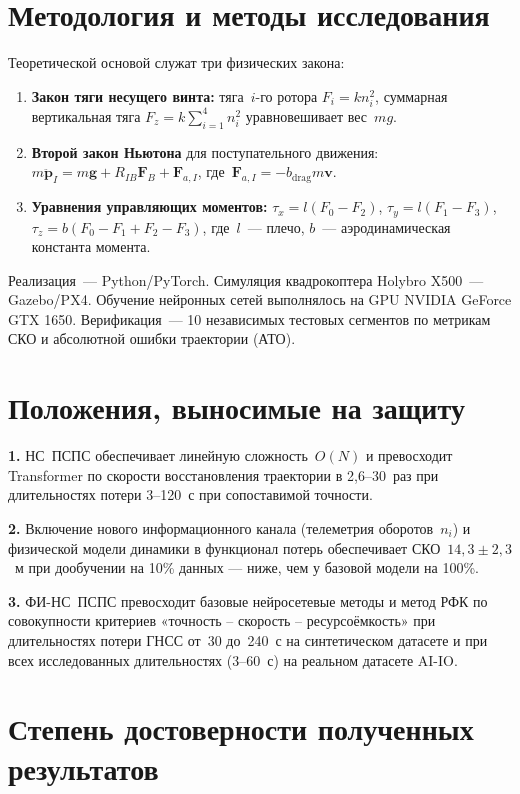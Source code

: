 \section{Методология и методы исследования}

Теоретической основой служат три физических закона:

\begin{enumerate}
	\item \textbf{Закон тяги несущего винта:} тяга~$i$-го ротора $F_i = k n_i^2$,
	суммарная вертикальная тяга $F_z = k\textstyle\sum_{i=1}^4 n_i^2$ уравновешивает вес~$mg$.
	\item \textbf{Второй закон Ньютона} для поступательного движения:
	$m\ddot{\mathbf{p}}_I = m\mathbf{g} + R_{IB}\mathbf{F}_B + \mathbf{F}_{a,I}$,
	где~$\mathbf{F}_{a,I} = {-}b_\text{drag}m\mathbf{v}$.
	\item \textbf{Уравнения управляющих моментов:} $\tau_x = l(F_0{-}F_2)$,
	$\tau_y = l(F_1{-}F_3)$, $\tau_z = b(F_0{-}F_1{+}F_2{-}F_3)$,
	где~$l$~--- плечо, $b$~--- аэродинамическая константа момента.
\end{enumerate}

Реализация~--- Python/PyTorch. Симуляция квадрокоптера Holybro X500~--- Gazebo/PX4.
Обучение нейронных сетей выполнялось на GPU NVIDIA GeForce GTX 1650. Верификация~--- 10 независимых
тестовых сегментов по метрикам СКО и абсолютной ошибки траектории (АТО).

\section{Положения, выносимые на защиту}

\textbf{1.} НС~ПСПС обеспечивает линейную сложность~$O(N)$ и превосходит Transformer по
скорости восстановления траектории в 2,6--30~раз при длительностях потери 3--120~с при
сопоставимой точности.

\textbf{2.} Включение нового информационного канала (телеметрия оборотов~$n_i$) и
физической модели динамики в функционал потерь обеспечивает СКО~$14{,}3{\pm}2{,}3$~м
при дообучении на 10\% данных --- ниже, чем у базовой модели на 100\%.

\textbf{3.} ФИ-НС~ПСПС превосходит базовые нейросетевые методы и метод РФК по
совокупности критериев «точность -- скорость -- ресурсоёмкость» при длительностях потери
ГНСС от~30 до~240~с на синтетическом датасете и при всех исследованных длительностях
(3--60~с) на реальном датасете AI-IO.

\section{Степень достоверности полученных результатов}

